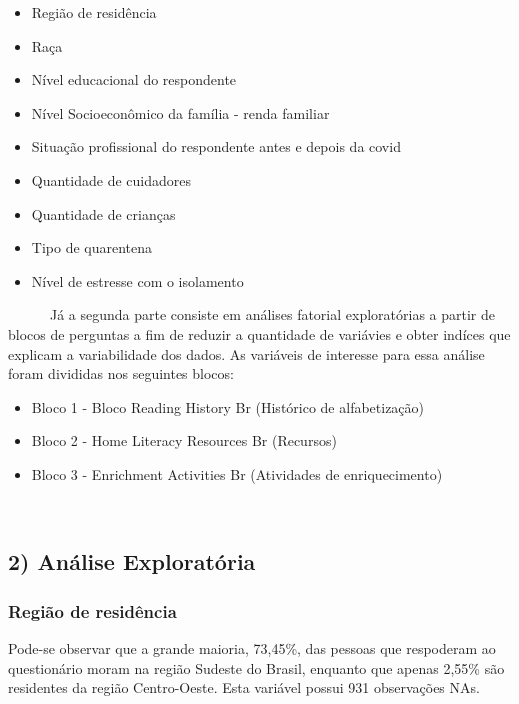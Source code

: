 \documentclass[
]{article}
\begin{document}
\begin{itemize}
\item
  Região de residência
\item
  Raça
\item
  Nível educacional do respondente
\item
  Nível Socioeconômico da família - renda familiar
\item
  Situação profissional do respondente antes e depois da covid
\item
  Quantidade de cuidadores
\item
  Quantidade de crianças
\item
  Tipo de quarentena
\item
  Nível de estresse com o isolamento
\end{itemize}

~~~~~~Já a segunda parte consiste em análises fatorial exploratórias a
partir de blocos de perguntas a fim de reduzir a quantidade de variávies
e obter indíces que explicam a variabilidade dos dados. As variáveis de
interesse para essa análise foram divididas nos seguintes blocos:

\begin{itemize}
\item
  Bloco 1 - Bloco Reading History Br (Histórico de alfabetização)
\item
  Bloco 2 - Home Literacy Resources Br (Recursos)
\item
  Bloco 3 - Enrichment Activities Br (Atividades de enriquecimento)
\end{itemize}

~\\

\hypertarget{anuxe1lise-exploratuxf3ria}{%
\subsection{\texorpdfstring{2) \textbf{Análise
Exploratória}}{2) Análise Exploratória}}\label{anuxe1lise-exploratuxf3ria}}

\hypertarget{regiuxe3o-de-residuxeancia}{%
\subsubsection{\texorpdfstring{\textbf{Região de
residência}}{Região de residência}}\label{regiuxe3o-de-residuxeancia}}

Pode-se observar que a grande maioria, 73,45\%, das pessoas que
respoderam ao questionário moram na região Sudeste do Brasil, enquanto
que apenas 2,55\% são residentes da região Centro-Oeste. Esta variável
possui 931 observações NAs.
\end{document}
